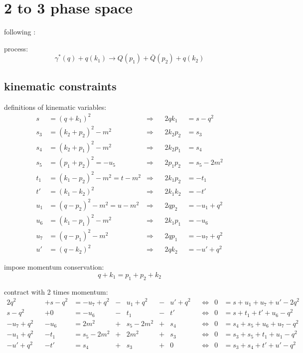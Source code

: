 \documentclass[
  english,		%
  a4paper,		%
  11pt,			%
  DIV=12,
  titlepage,
  toc=bibnumbered,
  parskip=full,  	%
  headings=normal,
  BCOR=12mm,
  numbers=noenddot
]{scrartcl}
\begin{document}
\section{2 to 3 phase space}
following \cite{PhysRevD.40.54,van_neerven_dimensional_1986,Marco}:

process:
\begin{equation}
\gamma^*(q) + q(k_1) \rightarrow Q(p_1)+\bar{Q}(p_2) + q(k_2)
\end{equation}

\subsection{kinematic constraints}

definitions of kinematic variables:
\begin{align}
s &= (q+k_1)^2 &\Rightarrow& &2qk_1 &= s-q^2\\
s_3 &= (k_2+p_2)^2-m^2  &\Rightarrow& &2k_2p_2 &= s_3\\
s_4 &= (k_2+p_1)^2-m^2  &\Rightarrow& &2k_2p_1 &= s_4\\
s_5 &= (p_1+p_2)^2 = -u_5  &\Rightarrow& &2p_1p_2 &= s_5-2m^2\\
t_1 &= (k_1-p_2)^2-m^2 = t - m^2  &\Rightarrow& &2k_1p_2 &=-t_1\\
t' &= (k_1-k_2)^2  &\Rightarrow& &2k_1k_2 &= -t'\\
u_1 &= (q-p_2)^2-m^2 = u - m^2  &\Rightarrow& &2qp_2 &=-u_1+q^2\\
u_6 &= (k_1-p_1)^2 - m^2  &\Rightarrow& &2k_1p_1 &=-u_6\\
u_7 &= (q-p_1)^2 - m^2  &\Rightarrow& &2qp_1 &=-u_7+q^2\\
u' &= (q-k_2)^2  &\Rightarrow& &2qk_2 &=-u'+q^2
\end{align}

impose momentum conservation:
\begin{equation}
q+k_1 = p_1+p_2+k_2
\end{equation}

contract with 2 times momentum:
\begin{align}
2q^2 && +s-q^2 &=-u_7+q^2 &-& u_1+q^2 &-& u'+q^2 &&\Leftrightarrow &0 &=s+u_1+u_7+u'-2q^2 \label{eq:MomCon3wq} \\
s-q^2 && +0 &= -u_6 &-& t_1 &-& t' &&\Leftrightarrow &0 &= s+t_1+t'+u_6-q^2 \label{eq:MomCon3wk1}\\
-u_7+q^2 && -u_6 &= 2m^2 &+& s_5-2m^2 &+& s_4 &&\Leftrightarrow &0 &= s_4+s_5+u_6+u_7-q^2 \label{eq:MomCon3wp1}\\
-u_1+q^2 && -t_1 &= s_5-2m^2 &+& 2m^2 &+& s_3 &&\Leftrightarrow &0 &= s_3+s_5+t_1+u_1-q^2 \label{eq:MomCon3wp2}\\
-u'+q^2 && -t' &= s_4 &+& s_3 &+& 0 &&\Leftrightarrow &0 &= s_3+s_4+t'+u'-q^2 \label{eq:MomCon3wk2}
\end{align}
\end{document}
